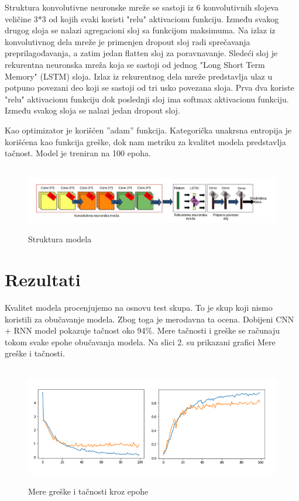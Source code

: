 \documentclass{article}
\begin{document}
Struktura konvolutivne neuronske mreže se sastoji iz 6 konvolutivnih slojeva veličine 3*3 od kojih svaki koristi "relu" aktivacionu funkciju. Između svakog drugog sloja se nalazi agregacioni sloj sa funkcijom maksimuma.
Na izlaz iz konvolutivnog dela mreže je primenjen dropout sloj radi sprečavanja
preprilagođavanja, a zatim jedan flatten sloj za poravnavanje.
Sledeći sloj je rekurentna neuronska mreža koja se sastoji od jednog "Long Short Term Memory" (LSTM) sloja.
Izlaz iz rekurentnog dela mreže predstavlja ulaz u potpuno povezani deo koji se
sastoji od tri usko povezana sloja. Prva dva koriste "relu" aktivacionu funkciju dok poslednji sloj ima softmax aktivacionu funkciju. Između svakog sloja se nalazi jedan dropout sloj. 

Kao optimizator je korišćen ”adam” funkcija. Kategorička unakrsna entropija je korišćena kao funkcija greške, dok nam metriku za kvalitet modela predstavlja tačnost. Model je treniran na 100 epoha. 


\begin{figure}[ht]
\hbox{\hspace{-3em} \includegraphics[scale=0.5]{model.jpg}}
\caption{Struktura modela}
\end{figure}


\newpage

\section{Rezultati}

Kvalitet modela procenjujemo na osnovu test skupa. To je skup koji nismo koristili za obučavanje modela. Zbog toga je merodavna ta ocena.
Dobijeni CNN + RNN model pokazuje tačnost oko 94\%. Mere tačnosti i greške se računaju tokom svake epohe obučavanja modela. Na slici 2. su prikazani grafici Mere greške i tačnosti.

\begin{figure}[h]
\centering
\hbox{\hspace{-3em} \includegraphics[scale=0.6]{grafik}}
\caption{Mere greške i tačnosti kroz epohe}
\end{figure}
\end{document}
